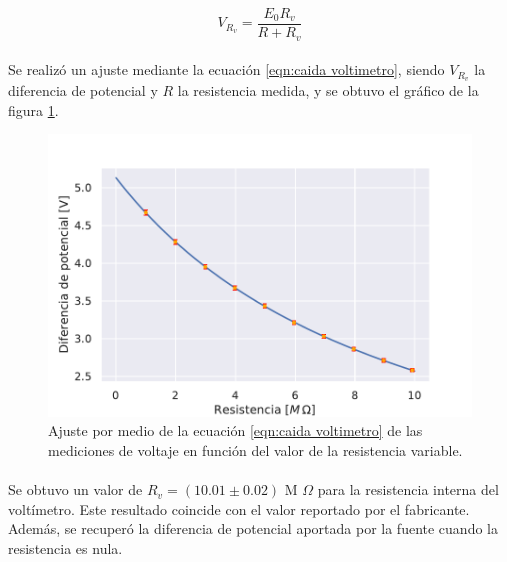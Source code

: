 \begin{equation}\label{eqn:caida voltimetro}
    V_{R_v} = \frac{E_0 R_v}{R + R_v}
\end{equation}
\paragraph{}
Se realizó un ajuste mediante la ecuación \ref{eqn:caida voltimetro}, siendo $V_{R_v}$ la diferencia de potencial y $R$ la resistencia medida, y se obtuvo el gráfico de la figura \ref{fig:fig_voltimetro}.
\begin{figure}[H]
    \centering
    \includegraphics[width = 0.65\linewidth]{figuras/voltimetro.pdf}
    \caption{Ajuste por medio de la ecuación \ref{eqn:caida voltimetro} de las mediciones de voltaje en función del valor de la resistencia variable.}
    \label{fig:fig_voltimetro}
\end{figure}
\paragraph{}
 Se obtuvo un valor de $R_v=(10.01\pm0.02)$ M $\Omega$ para la resistencia interna del voltímetro. Este resultado coincide con el valor reportado por el fabricante. Además, se recuperó la diferencia de potencial aportada por la fuente cuando la resistencia es nula.
